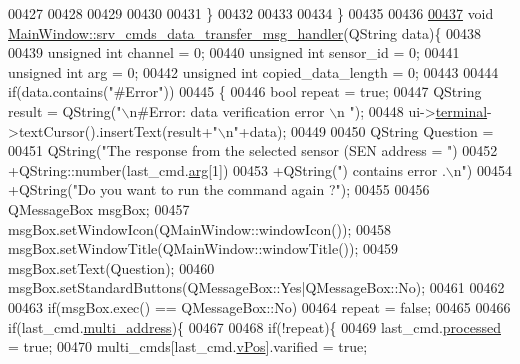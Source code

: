 \begin{DoxyCode}
{{{{{{{{{{{{{{{{00427 
00428 
00429 
00430 
00431      \}
00432 
00433 
00434 \}
00435 
00436 
\hypertarget{a00136_source_l00437}{}\hyperlink{a00017_ae19ec21c1009c81700a8ad2e1f81be07}{00437} \textcolor{keywordtype}{void} \hyperlink{a00017_ae19ec21c1009c81700a8ad2e1f81be07}{MainWindow::srv\_cmds\_data\_transfer\_msg\_handler}(QString 
      data)\{
00438 
00439     \textcolor{keywordtype}{unsigned} \textcolor{keywordtype}{int}  channel               = 0;
00440     \textcolor{keywordtype}{unsigned} \textcolor{keywordtype}{int}  sensor\_id             = 0;
00441     \textcolor{keywordtype}{unsigned} \textcolor{keywordtype}{int}  arg                   = 0;
00442     \textcolor{keywordtype}{unsigned} \textcolor{keywordtype}{int}  copied\_data\_length    = 0;
00443 
00444         \textcolor{keywordflow}{if}(data.contains(\textcolor{stringliteral}{"#Error"}))
00445         \{
00446              \textcolor{keywordtype}{bool} repeat = \textcolor{keyword}{true};
00447              QString result =  QString(\textcolor{stringliteral}{"\(\backslash\)n#Error: data verification error \(\backslash\)n "});
00448              ui->\hyperlink{a00080_aae71c46ea4546df5994735dee573b2dd}{terminal}->textCursor().insertText(result+\textcolor{stringliteral}{"\(\backslash\)n"}+data);
00449 
00450              QString Question =
00451                      QString(\textcolor{stringliteral}{"The response from the selected sensor (SEN address = "})
00452                      +QString::number(last\_cmd.\hyperlink{a00004_a56e6c2d7315d0ae60a51e8b140c9cfe4}{arg}[1])
00453                      +QString(\textcolor{stringliteral}{") contains error .\(\backslash\)n"})
00454                      +QString(\textcolor{stringliteral}{"Do you want to run the command again ?"});
00455 
00456              QMessageBox msgBox;
00457              msgBox.setWindowIcon(QMainWindow::windowIcon());
00458              msgBox.setWindowTitle(QMainWindow::windowTitle());
00459              msgBox.setText(Question);
00460              msgBox.setStandardButtons(QMessageBox::Yes|QMessageBox::No);
00461 
00462 
00463              \textcolor{keywordflow}{if}(msgBox.exec() == QMessageBox::No)
00464                       repeat = \textcolor{keyword}{false};
00465 
00466                  \textcolor{keywordflow}{if}(last\_cmd.\hyperlink{a00004_a8e69b971c61ced27a7567efd2bf0db59}{multi\_address})\{
00467 
00468                      \textcolor{keywordflow}{if}(!repeat)\{
00469                      last\_cmd.\hyperlink{a00004_a3e88f779da9798a5da7dda227e2ca388}{processed} = \textcolor{keyword}{true};
00470                      multi\_cmds[last\_cmd.\hyperlink{a00004_a2b48b371fd84be2a8ad581b1ad708b88}{vPos}].varified = \textcolor{keyword}{true};
}}}}}}}}}}}}}}}}
\end{DoxyCode}
